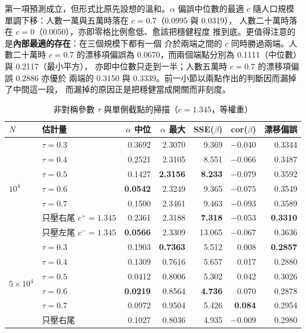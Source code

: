\documentclass[UTF8, fontset=macnew, a4paper, 12pt]{ctexart}
\begin{document}
第一項預測成立，但形式比原先設想的溫和。$\alpha$ 偏誤中位數的最適 $c$
隨人口規模單調下移：人數一萬與五萬時落在 $c=0.7$（0.0995 與 0.0319），
人數二十萬時落在 $c=0$（0.0050），亦即零格比例愈低、愈該把穩健程度
推到底。更值得注意的是\textbf{內部最適的存在}：在三個規模下都有一個
介於兩端之間的 $c$ 同時勝過兩端。人數二十萬時 $c=0.7$ 的漂移項偏誤為
0.0670，而兩個端點分別為 0.1111（中位數）與 0.2117（最小平方），
亦即中位數只走到一半；人數五萬時 $c=0.7$ 的漂移項偏誤 0.2886 亦優於
兩端的 0.3150 與 0.3339。前一小節以兩點作出的判斷因而漏掉了中間這一段，
而漏掉的原因正是把穩健當成開關而非刻度。

\begin{table}[H]
\centering
\caption{非對稱參數 $\tau$ 與單側截點的掃描（$c=1.345$，等權重）}
\small
\begin{tabular}{llrrrrr}
\toprule
$N$ & 估計量 & $\alpha$ 中位 & $\alpha$ 最大 & SSE($\beta$) & cor($\beta$) & 漂移偏誤\\
\midrule
\multirow{7}{*}{$10^4$}
 & $\tau=0.3$              & 0.3692 & 2.3070 & 9.369 & $-0.040$ & 0.3344\\
 & $\tau=0.4$              & 0.2521 & 2.3105 & 8.551 & $-0.066$ & 0.3487\\
 & $\tau=0.5$              & 0.1427 & \textbf{2.3156} & \textbf{8.233} & $-0.079$ & 0.3592\\
 & $\tau=0.6$              & \textbf{0.0542} & 2.3249 & 9.365 & $-0.075$ & 0.3549\\
 & $\tau=0.7$              & 0.1500 & 2.3461 & 9.463 & $-0.093$ & 0.3589\\
 & 只壓右尾 $c^+\!=\!1.345$ & 0.2361 & 2.3188 & \textbf{7.318} & $-0.053$ & \textbf{0.3310}\\
 & 只壓左尾 $c^-\!=\!1.345$ & \textbf{0.0566} & 2.3309 & 13.065 & $-0.067$ & 0.3636\\
\midrule
\multirow{7}{*}{$5\times10^4$}
 & $\tau=0.3$              & 0.1903 & \textbf{0.7363} & 5.512 & 0.008 & \textbf{0.2857}\\
 & $\tau=0.4$              & 0.1309 & 0.7616 & 5.657 & 0.017 & 0.2880\\
 & $\tau=0.5$              & 0.0412 & 0.8006 & 5.302 & 0.042 & 0.3026\\
 & $\tau=0.6$              & \textbf{0.0219} & 0.8564 & \textbf{4.736} & 0.070 & 0.2878\\
 & $\tau=0.7$              & 0.0972 & 0.9504 & 5.426 & \textbf{0.084} & 0.2954\\
 & 只壓右尾                & 0.1027 & 0.8036 & 4.935 & $-0.009$ & 0.2980\\

\end{tabular}
\end{table}
\end{document}
